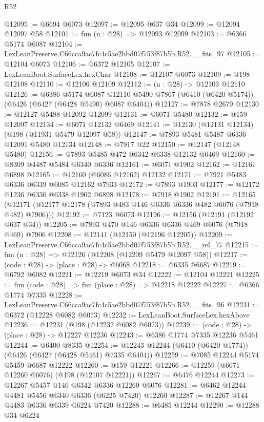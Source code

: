 \begin{lexlean}{R52}
\begin{coremodule}
@12095 := @6694 @6073
@12097 := @12095 @637 @34
@12099 := @12094 @12097 @58
@12101 := fun (n : @28) => @12093 @12099
@12103 := @6366 @5174 @6087
@12104 := LexLeanPreserve.C66cca9ac7fc4c5ae2bbd07f753f87b5b.R52.__fits_97
@12105 := @12104 @6073
@12106 := @6372 @12105
@12107 := LexLeanBoot.SurfaceLex.hexChar
@12108 := @12107 @6073
@12109 := @198 @12108
@12110 := @12106 @12109
@12112 := (n : @28) -> @12103 @12110
@12126 := @6386
    @5174
    @6087
    @12110
    @5490
    @7867
    (@6410 (@6420 @5174))
    (@6426 (@6427 (@6428 @5490) @6087 @6404))
@12127 := @7878 @2679
@12130 := @12127 @5488 @12092 @12099
@12131 := @6071 @5480
@12132 := @159 @12097
@12134 := @6071 @12132 @6469
@12141 := @12130 (@12131 @12134) (@198 (@11931 @5479 @12097 @58))
@12147 := @7893 @5481 @5487 @6336 @12091 @5480 @12134
@12148 := @7917 @22
@12150 := @12147 (@12148 @5480)
@12156 := @7893 @5485 @472 @6342 @6338 @12132 @6469
@12160 := @8309 @4487 @5484 @6340 @6336
@12161 := @6071 @1902
@12162 := @12161 @6898
@12165 := @12160 (@6086 @12162) @12132
@12171 := @7921 @5483 @6336 @6339 @6085 @12162 @7933
@12172 := @7893 @1903
@12177 := @12172 @1236 @6336 @6338 @1902 @6898
@12178 := @7918 @1902
@12191 := @12165
    (@12171 (@12177 @12178 (@7893 @483 @146 @6336 @6336 @482 @6076 (@7918 @482) @7906)))
@12192 := @7123 @6073
@12196 := @12156 (@12191 (@12192 @637 @34))
@12205 := @7893 @470 @146 @6336 @6336 @469 @6076 (@7918 @469) @7906
@12208 := @12141 (@12150 (@12196 @12205))
@12209 := LexLeanPreserve.C66cca9ac7fc4c5ae2bbd07f753f87b5b.R52.__rel_77
@12215 := fun (n : @28) => @12126 (@12208 (@12209 @5479 @12097 @58))
@12217 := (code : @28) -> (place : @28) -> @6068
@12218 := @6335 @6687
@12219 := @6792 @6082
@12221 := @12219 @6073 @34
@12222 := @12104 @12221
@12225 := fun (code : @28) => fun (place : @28) => @12218 @12222
@12227 := @6366 @1774 @7335
@12228 := LexLeanPreserve.C66cca9ac7fc4c5ae2bbd07f753f87b5b.R52.__fits_96
@12231 := @6372 (@12228 @6082 @6073)
@12232 := LexLeanBoot.SurfaceLex.hexAbove
@12236 := @12231 (@198 (@12232 @6082 @6073))
@12239 := (code : @28) -> (place : @28) -> @12227 @12236
@12243 := @6386 @1774 @7335 @12236 @5461
@12244 := @6400 @8335
@12254 := @12243 @12244 (@6410 (@6420 @1774)) (@6426 (@6427 (@6428 @5461) @7335 @6404))
@12259 := @7085 @12244 @5174 @5459 @6687 @12222
@12260 := @159 @12221
@12266 := @12259 (@6071 @12260 @6076) (@198 (@12107 @12221))
@12267 := @6476 @12244
@12273 := @12267 @5457 @146 @6342 @6336 @12260 @6076
@12281 := @6462 @12244 @4481 @5456 @6340 @6336 (@6225 @7420) @12260
@12287 := @12267 @144 @4483 @6336 @6339 @6224 @7420
@12288 := @6485 @12244
@12290 := @12288 @34 @6224

\end{coremodule}
\end{lexlean}
